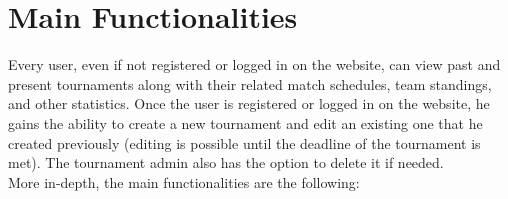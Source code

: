 \section{Main Functionalities}

\noindent Every user, even if not registered or logged in on the website, can view past and present tournaments along with their related match schedules, team standings,
and other statistics. Once the user is registered or logged in on the website, he gains the ability to create a new  tournament and edit an existing one that he created previously (editing is possible until the deadline of the tournament is met). The tournament admin also has the option to delete it if needed. \\

\noindent More in-depth, the main functionalities are the following:
